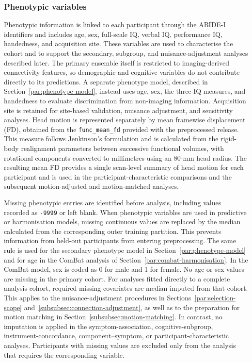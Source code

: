 \subsubsection{Phenotypic variables}
\label{subsubsec:phenotypic-variables}

Phenotypic information is linked to each participant through the ABIDE-I identifiers and
includes age, sex, full-scale IQ, verbal IQ, performance IQ, handedness, and acquisition
site. These variables are used to characterise the cohort and to support the secondary,
subgroup, and nuisance-adjustment analyses described later. The primary ensemble itself is
restricted to imaging-derived connectivity features, so demographic and cognitive variables
do not contribute directly to its predictions. A separate phenotype model, described in
Section~\ref{par:phenotype-model}, instead uses age, sex, the three IQ measures, and handedness to
evaluate discrimination from non-imaging information. Acquisition site is retained for
site-based validation, nuisance adjustment, and sensitivity analyses. Head motion is represented separately by mean framewise displacement (FD), obtained from
the \texttt{func\_mean\_fd}  provided with the preprocessed release. This
measure follows Jenkinson's formulation and is calculated from the rigid-body realignment
parameters between successive functional volumes, with rotational components converted to
millimetres using an 80-mm head radius. The resulting mean FD
provides a single scan-level summary of head motion for each participant and is used in the
participant-characteristic comparisons and the subsequent motion-adjusted and
motion-matched analyses.

Missing phenotypic entries are identified before analysis, including values recorded as
\texttt{-9999} or left blank. When phenotypic variables are used in predictive or
harmonisation models, missing continuous values are replaced by the median calculated from
the corresponding outer training partition. This prevents information from held-out
participants from entering preprocessing. The same rule is used for the secondary
phenotype model in Section~\ref{par:phenotype-model} and for age in the ComBat analysis of
Section~\ref{par:combat-harmonisation}. In the ComBat model, sex is coded as 0 for male and 1 for female.
No age or sex values are missing in the primary cohort. For analyses fitted directly to a complete analysis cohort, required missing covariates are
median-imputed from that cohort. This applies to the nuisance-adjustment procedures in
Sections~\ref{par:selection-scope} and~\ref{subsubsec:connection-adjustment}, as well as to the preparation for motion
matching in Section~\ref{subsubsec:motion-matching}. In contrast, no imputation is applied in the
symptom-association, cognitive-subgroup, instrument-concordance, component--symptom, or
participant-characteristic analyses. Participants with missing values are excluded only
from the analysis that requires the corresponding variable.

